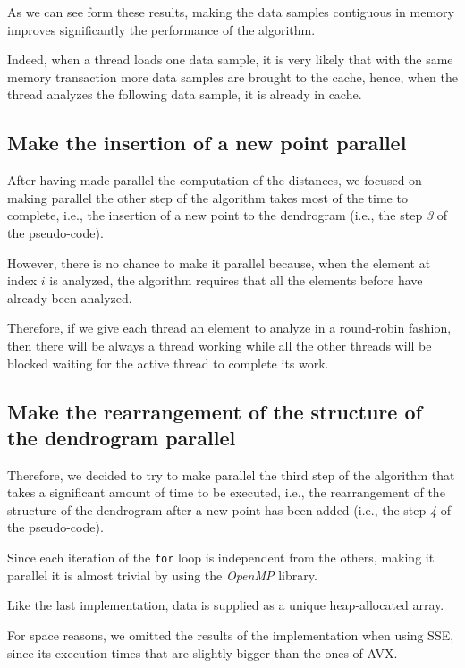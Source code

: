 \documentclass{article}
\begin{document}
As we can see form these results, making the data samples contiguous in memory improves
significantly the performance of the algorithm.

Indeed, when a thread loads one data sample, it is very likely that with the same memory
transaction more data samples are brought to the cache, hence, when the thread analyzes the
following data sample, it is already in cache.

\hypertarget{stage-3-parallel}{
\subsection{Make the insertion of a new point parallel}
\label{stage-3-parallel}}

After having made parallel the computation of the distances, we focused on making parallel the other
step of the algorithm takes most of the time to complete, i.e., the insertion of a new point to
the dendrogram (i.e., the step \textit{3} of the pseudo-code).

However, there is no chance to make it parallel because, when the element at index $i$ is
analyzed, the algorithm requires that all the elements before have already been analyzed.

Therefore, if we give each thread an element to analyze in a round-robin fashion, then there will
be always a thread working while all the other threads will be blocked waiting for the active
thread to complete its work.

\hypertarget{stage-4-parallel}{
\subsection{Make the rearrangement of the structure of the dendrogram parallel}
\label{stage-4-parallel}}

Therefore, we decided to try to make parallel the third step of the algorithm that takes a
significant amount of time to be executed, i.e., the rearrangement of the structure of the
dendrogram after a new point has been added (i.e., the step \textit{4} of the pseudo-code).

Since each iteration of the \texttt{for} loop is independent from the others, making it parallel
it is almost trivial by using the \emph{OpenMP} library.

Like the last implementation, data is supplied as a unique heap-allocated array.

For space reasons, we omitted the results of the implementation when using SSE, since its
execution times that are slightly bigger than the ones of AVX.
\end{document}
